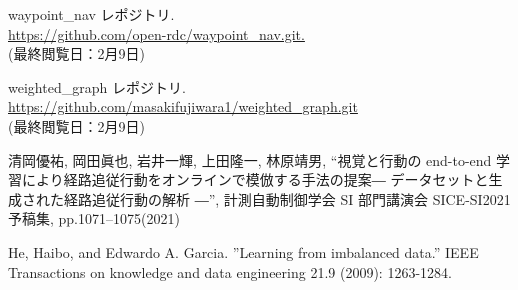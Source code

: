 \documentclass{jarticle}
\begin{document}
\begin{thebibliography}{99}
waypoint\_nav レポジトリ. \\\url{https://github.com/open-rdc/waypoint_nav.git.}\\
(最終閲覧日：2月9日)

weighted\_graph レポジトリ. \\\url{https://github.com/masakifujiwara1/weighted_graph.git}\\
(最終閲覧日：2月9日)

清岡優祐, 岡田眞也, 岩井一輝, 上田隆一, 林原靖男, “視覚と行動の end-to-end 学習により経路追従行動をオンラインで模倣する手法の提案―
データセットと生成された経路追従行動の解析 ―”, 計測自動制御学会 SI 部門講演会 SICE-SI2021 予稿集, pp.1071–1075(2021)

He, Haibo, and Edwardo A. Garcia. ”Learning from imbalanced data.” IEEE Transactions on knowledge and data engineering 21.9 (2009): 1263-1284.

\end{thebibliography}

\normalsize
\end{document}
